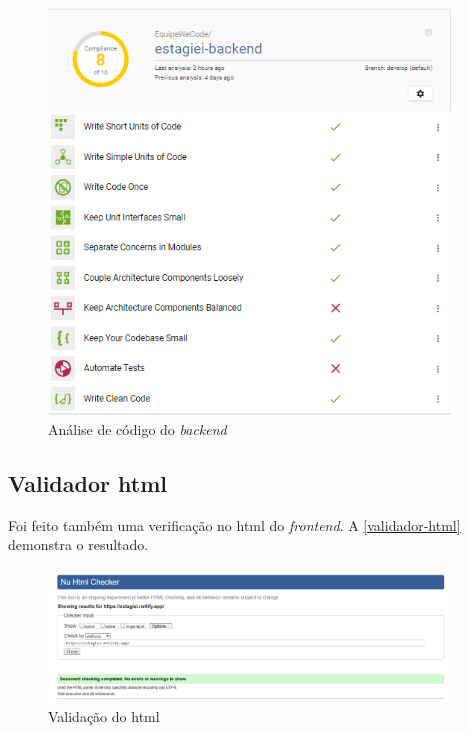 \begin{figure}[H]
	\centering
	\caption{\label{better-code-back}Análise de código do \textit{\gls{backend}}}
	\includegraphics[width=0.95\textwidth]{../imagens/web-tests/better-code-back.png}
\end{figure}

\subsection{Validador \ac{html}}
Foi feito também uma verificação no \ac{html} do \textit{\gls{frontend}}. A \autoref{validador-html} demonstra o resultado.

\begin{figure}[H]
	\centering
	\caption{\label{validador-html}Validação do \ac{html}}
	\includegraphics[width=0.95\textwidth]{../imagens/web-tests/validador-html.png}
\end{figure}